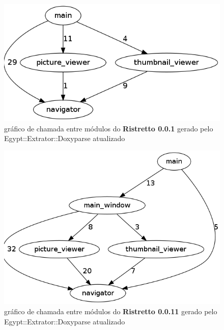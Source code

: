 \begin{figure}
\center
\includegraphics[scale=0.5]{imagens/ristretto-0_0_1-doxyparse-2}
\caption{gráfico de chamada entre módulos do {\bf Ristretto 0.0.1} gerado pelo Egypt::Extrator::Doxyparse atualizado}
\label{ristretto-0.0.1-doxyparse-2}
\end{figure}

\begin{figure}
\center
\includegraphics[scale=0.5]{imagens/ristretto-0_0_11-doxyparse-2}
\caption{gráfico de chamada entre módulos do {\bf Ristretto 0.0.11} gerado pelo Egypt::Extrator::Doxyparse atualizado}
\label{ristretto-0.0.11-doxyparse-2}
\end{figure}

